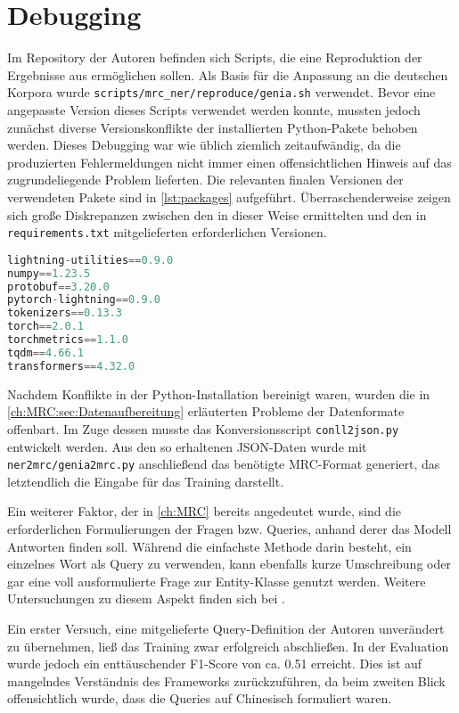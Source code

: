\section{Debugging}
\label{ch:Training:sec:Debugging}

Im Repository der Autoren befinden sich Scripts, die eine Reproduktion der Ergebnisse aus \cite{li2019unified} ermöglichen sollen. Als Basis für die Anpassung an die deutschen Korpora wurde \verb|scripts/mrc_ner/reproduce/genia.sh| verwendet. Bevor eine angepasste Version dieses Scripts verwendet werden konnte, mussten jedoch zunächst diverse Versionskonflikte der installierten Python-Pakete behoben werden. Dieses Debugging war wie üblich ziemlich zeitaufwändig, da die produzierten Fehlermeldungen nicht immer einen offensichtlichen Hinweis auf das zugrundeliegende Problem lieferten. Die relevanten finalen Versionen der verwendeten Pakete sind in \autoref{lst:packages} aufgeführt. Überraschenderweise zeigen sich große Diskrepanzen zwischen den in dieser Weise ermittelten und den in \verb|requirements.txt| mitgelieferten erforderlichen Versionen.

\begin{lstlisting}[caption={Liste der verwendeten Pakete}, language={Python}, label={lst:packages}]
lightning-utilities==0.9.0
numpy==1.23.5
protobuf==3.20.0
pytorch-lightning==0.9.0
tokenizers==0.13.3
torch==2.0.1
torchmetrics==1.1.0
tqdm==4.66.1
transformers==4.32.0
\end{lstlisting}

Nachdem Konflikte in der Python-Installation bereinigt waren, wurden die in \autoref{ch:MRC:sec:Datenaufbereitung} erläuterten Probleme der Datenformate offenbart. Im Zuge dessen musste das Konversionsscript \verb|conll2json.py| entwickelt werden. Aus den so erhaltenen JSON-Daten wurde mit \verb|ner2mrc/genia2mrc.py| anschließend das benötigte MRC-Format generiert, das letztendlich die Eingabe für das Training darstellt.

Ein weiterer Faktor, der in \autoref{ch:MRC} bereits angedeutet wurde, sind die erforderlichen Formulierungen der Fragen bzw. Queries, anhand derer das Modell Antworten finden soll. Während die einfachste Methode darin besteht, ein einzelnes Wort als Query zu verwenden, kann ebenfalls kurze Umschreibung oder gar eine voll ausformulierte Frage zur Entity-Klasse genutzt werden. Weitere Untersuchungen zu diesem Aspekt finden sich bei \cite[7]{li2019unified}.

Ein erster Versuch, eine mitgelieferte Query-Definition der Autoren unverändert zu übernehmen, ließ das Training zwar erfolgreich abschließen. In der Evaluation wurde jedoch ein enttäuschender F1-Score von ca. 0.51 erreicht. Dies ist auf mangelndes Verständnis des Frameworks zurückzuführen, da beim zweiten Blick offensichtlich wurde, dass die Queries auf Chinesisch formuliert waren.

